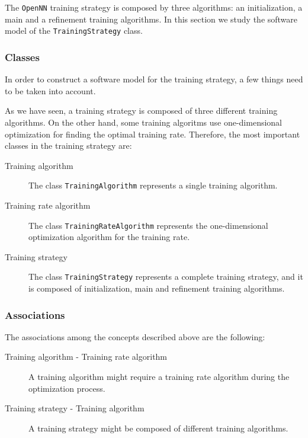 The \texttt{OpenNN} training strategy is composed by three algorithms: 
an initialization, a main and a refinement training algorithms. 
In this section we study the software model of the \lstinline"TrainingStrategy" class.

\subsubsection{Classes}

In order to construct a software model for the training strategy, a few
things need to be taken into account. 

As we have seen, a training strategy is composed of three different training algorithms. 
On the other hand, some training algoritms use one-dimensional optimization for finding the optimal training rate. 
Therefore, the most important classes in the training strategy are:

\begin{description}
\item[Training algorithm] The class \lstinline"TrainingAlgorithm" represents a single training algorithm.

\item[Training rate algorithm] The class \lstinline"TrainingRateAlgorithm" represents the one-dimensional optimization algorithm for the training rate.

\item[Training strategy] The class \lstinline"TrainingStrategy" represents a complete training strategy, 
and it is composed of initialization, main and refinement training algorithms. 
\end{description}

\subsubsection{Associations}

The associations among the concepts described above are the following:

\begin{description}
\item[Training algorithm - Training rate algorithm] A training algorithm might require a training rate algorithm during the optimization process.

\item[Training strategy - Training algorithm] A training strategy might be composed of different training algorithms.
\end{description}

